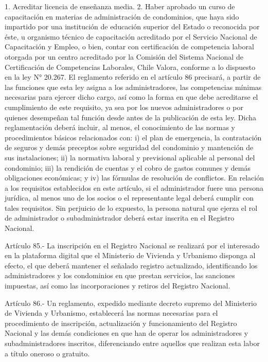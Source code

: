     1. Acreditar licencia de enseñanza media.
    2. Haber aprobado un curso de capacitación en materias de administración de condominios, que haya sido impartido por una institución de educación superior del Estado o reconocida por éste, u organismo técnico de capacitación acreditado por el Servicio Nacional de Capacitación y Empleo, o bien, contar con certificación de competencia laboral otorgada por un centro acreditado por la Comisión del Sistema Nacional de Certificación de Competencias Laborales, Chile Valora, conforme a lo dispuesto en la ley N° 20.267. El reglamento referido en el artículo 86 precisará, a partir de las funciones que esta ley asigna a los administradores, las competencias mínimas necesarias para ejercer dicho cargo, así como la forma en que debe acreditarse el cumplimiento de este requisito, ya sea por los nuevos administradores o por quienes desempeñan tal función desde antes de la publicación de esta ley. Dicha reglamentación deberá incluir, al menos, el conocimiento de las normas y procedimientos básicos relacionados con: i) el plan de emergencia, la contratación de seguros y demás preceptos sobre seguridad del condominio y mantención de sus instalaciones; ii) la normativa laboral y previsional aplicable al personal del condominio; iii) la rendición de cuentas y el cobro de gastos comunes y demás obligaciones económicas; y iv) las fórmulas de resolución de conflictos.
    En relación a los requisitos establecidos en este artículo, si el administrador fuere una persona jurídica, al menos uno de los socios o el representante legal deberá cumplir con tales requisitos. Sin perjuicio de lo expuesto, la persona natural que ejerza el rol de administrador o subadministrador deberá estar inscrita en el Registro Nacional.
     
    Artículo 85.- La inscripción en el Registro Nacional se realizará por el interesado en la plataforma digital que el Ministerio de Vivienda y Urbanismo disponga al efecto, el que deberá mantener el señalado registro actualizado, identificando los administradores y los condominios en que prestan servicios, las sanciones impuestas, así como las incorporaciones y retiros del Registro Nacional.
     
    Artículo 86.- Un reglamento, expedido mediante decreto supremo del Ministerio de Vivienda y Urbanismo, establecerá las normas necesarias para el procedimiento de inscripción, actualización y funcionamiento del Registro Nacional y las demás condiciones en que han de operar los administradores y subadministradores inscritos, diferenciando entre aquellos que realizan esta labor a título oneroso o gratuito.

